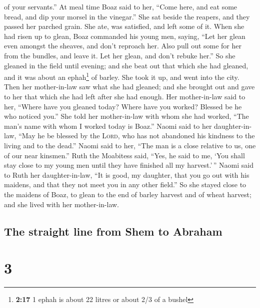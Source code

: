 of your servants.''  At meal time Boaz said to her,
``Come here, and eat some bread, and dip your morsel in the vinegar.''
She sat beside the reapers, and they passed her parched grain. She ate,
was satisfied, and left some of it.  When she had risen
up to glean, Boaz commanded his young men, saying, ``Let her glean even
amongst the sheaves, and don't reproach her.  Also pull
out some for her from the bundles, and leave it. Let her glean, and
don't rebuke her.''  So she gleaned in the field until
evening; and she beat out that which she had gleaned, and it was about
an ephah\footnote{\textbf{2:17} 1 ephah is about 22 litres or about 2/3
  of a bushel} of barley.  She took it up, and went into
the city. Then her mother-in-law saw what she had gleaned; and she
brought out and gave to her that which she had left after she had
enough.  Her mother-in-law said to her, ``Where have you
gleaned today? Where have you worked? Blessed be he who noticed you.''
She told her mother-in-law with whom she had worked, ``The man's name
with whom I worked today is Boaz.''  Naomi said to her
daughter-in-law, ``May he be blessed by the \textsc{Lord}, who has not
abandoned his kindness to the living and to the dead.'' Naomi said to
her, ``The man is a close relative to us, one of our near kinsmen.''
 Ruth the Moabitess said, ``Yes, he said to me, `You
shall stay close to my young men until they have finished all my
harvest.'\,''  Naomi said to Ruth her daughter-in-law,
``It is good, my daughter, that you go out with his maidens, and that
they not meet you in any other field.''  So she stayed
close to the maidens of Boaz, to glean to the end of barley harvest and
of wheat harvest; and she lived with her mother-in-law.

\hypertarget{the-straight-line-from-shem-to-abraham}{%
\subsection{The straight line from Shem to
Abraham}\label{the-straight-line-from-shem-to-abraham}}

\hypertarget{section-2}{%
\section{3}\label{section-2}}

